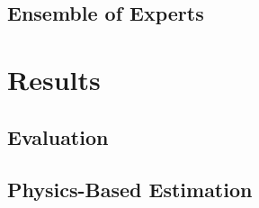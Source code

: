 \documentclass[9pt,journal,a4paper]{IEEEtran}
\begin{document}
\subsection{Ensemble of Experts}



\section{Results}
\label{sec:results}

\subsection{Evaluation}

\subsection{Physics-Based Estimation}
\end{document}
